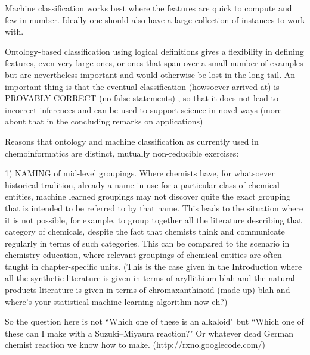 \documentclass[10pt]{bmc_article}
\newenvironment{bmcformat}{\baselineskip20pt\sloppy\setboolean{publ}{false}}{\baselineskip20pt\sloppy}
\begin{document}
\begin{bmcformat}
Machine classification works best where the features are quick to compute and few in number. Ideally one should also have a large collection of instances to work with.  

Ontology-based classification using logical definitions gives a flexibility in defining features, even very large ones, or ones that span over a small number of examples but are nevertheless important and would otherwise be lost in the long tail.  An important thing is that the eventual classification (howsoever arrived at) is PROVABLY CORRECT (no false statements) %
, so that it does not lead to incorrect inferences and can be used to support science in novel ways (more about that in the concluding remarks on applications)


Reasons that ontology and machine classification as currently used in chemoinformatics are distinct, mutually non-reducible exercises:  %

1) NAMING of mid-level groupings. Where chemists have, for whatsoever historical tradition, already a name in use for a particular class of chemical entities, machine learned groupings may not discover quite the exact grouping that is intended to be referred to by that name. This leads to the situation where it is not possible, for example, to group together all the literature describing that category of chemicals, despite the fact that chemists think and communicate regularly in terms of such categories.  This can be compared to the scenario in chemistry education, where relevant groupings of chemical entities are often taught in chapter-specific units. (This is the case given in the Introduction where all the synthetic literature is given in terms of aryllithium blah and the natural products literature is given in terms of chromaxanthinoid (made up) blah and where's your statistical machine learning algorithm now eh?)

So the question here is not ``Which one of these is an alkaloid" but ``Which one of these can I make with a Suzuki--Miyaura reaction?" Or whatever dead German chemist reaction we know how to make.  (http://rxno.googlecode.com/)


\end{bmcformat}
\end{document}
